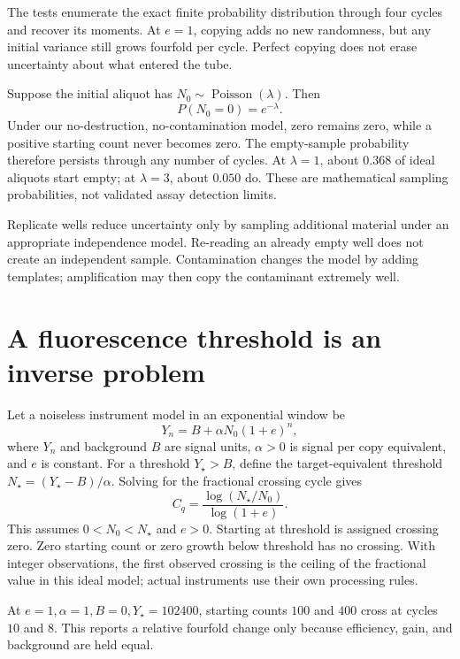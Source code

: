 The tests enumerate the exact finite probability distribution through four cycles and recover its moments. At $e=1$, copying adds no new randomness, but any initial variance still grows fourfold per cycle. Perfect copying does not erase uncertainty about what entered the tube.

Suppose the initial aliquot has $N_0\sim\operatorname{Poisson}(\lambda)$. Then
\begin{equation}
P(N_0=0)=e^{-\lambda}.
\end{equation}
Under our no-destruction, no-contamination model, zero remains zero, while a positive starting count never becomes zero. The empty-sample probability therefore persists through any number of cycles. At $\lambda=1$, about $0.368$ of ideal aliquots start empty; at $\lambda=3$, about $0.050$ do. These are mathematical sampling probabilities, not validated assay detection limits.

Replicate wells reduce uncertainty only by sampling additional material under an appropriate independence model. Re-reading an already empty well does not create an independent sample. Contamination changes the model by adding templates; amplification may then copy the contaminant extremely well.

\section{A fluorescence threshold is an inverse problem}
Let a noiseless instrument model in an exponential window be
\begin{equation}
Y_n=B+\alpha N_0(1+e)^n,
\end{equation}
where $Y_n$ and background $B$ are signal units, $\alpha>0$ is signal per copy equivalent, and $e$ is constant. For a threshold $Y_\star>B$, define the target-equivalent threshold
$N_\star=(Y_\star-B)/\alpha$. Solving for the fractional crossing cycle gives
\begin{equation}
C_q=\frac{\log(N_\star/N_0)}{\log(1+e)}. \label{eq:cq}
\end{equation}
This assumes $0<N_0<N_\star$ and $e>0$. Starting at threshold is assigned crossing zero. Zero starting count or zero growth below threshold has no crossing. With integer observations, the first observed crossing is the ceiling of the fractional value in this ideal model; actual instruments use their own processing rules.

At $e=1,\alpha=1,B=0,Y_\star=102400$, starting counts $100$ and $400$ cross at cycles $10$ and $8$. This reports a relative fourfold change only because efficiency, gain, and background are held equal.

